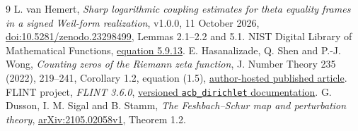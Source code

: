 \documentclass[11pt]{article}
\numberwithin{equation}{section}
\begin{document}
\begin{thebibliography}{9}
 L. van Hemert, \emph{Sharp logarithmic coupling estimates
for theta equality frames in a signed Weil-form realization}, v1.0.0,
11 October 2026, \href{https://doi.org/10.5281/zenodo.23298499}
{doi:10.5281/zenodo.23298499}, Lemmas 2.1--2.2 and 5.1.
 NIST Digital Library of Mathematical Functions,
\href{https://dlmf.nist.gov/5.9.E13}{equation 5.9.13}.
 E. Hasanalizade, Q. Shen and P.-J. Wong,
\emph{Counting zeros of the Riemann zeta function}, J. Number Theory
235 (2022), 219--241, Corollary 1.2, equation (1.5),
\href{https://www-math.nsysu.edu.tw/~pjwong/stuff/CountingRiemannZeros.pdf}
{author-hosted published article}.
 FLINT project, \emph{FLINT 3.6.0},
\href{https://raw.githubusercontent.com/flintlib/flint/v3.6.0/doc/source/acb_dirichlet.rst}
{versioned \texttt{acb\_dirichlet} documentation}.
 G. Dusson, I. M. Sigal and B. Stamm,
\emph{The Feshbach--Schur map and perturbation theory},
\href{https://arxiv.org/abs/2105.02058v1}{arXiv:2105.02058v1}, Theorem 1.2.
\end{thebibliography}
\end{document}
